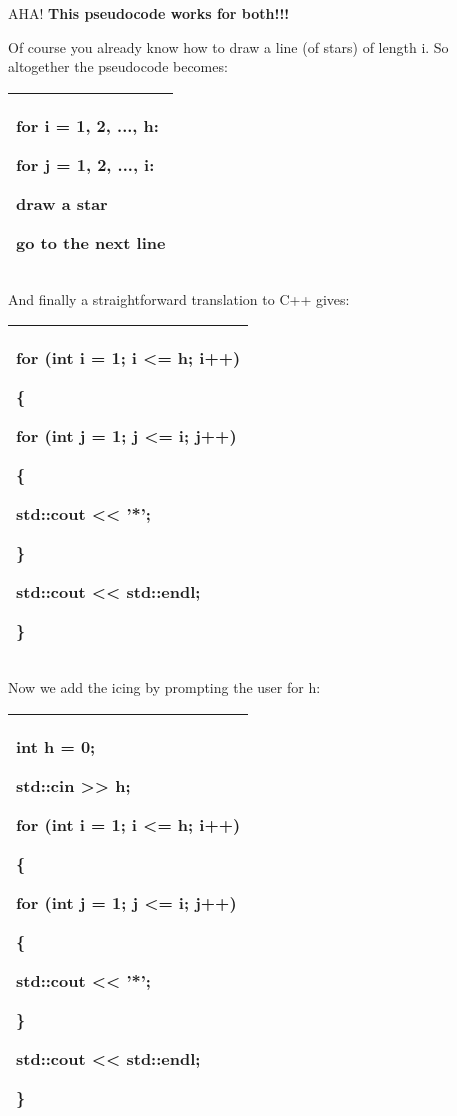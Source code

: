 \documentclass[
]{article}
\begin{document}
AHA! \textbf{This pseudocode works for both!!!}

Of course you already know how to draw a line (of stars) of length i. So
altogether the pseudocode becomes:

\begin{longtable}[]{@{}l@{}}
\toprule
\endhead
\begin{minipage}[t]{0.97\columnwidth}\raggedright
for i = 1, 2, ..., h:

for j = 1, 2, ..., i:

draw a star

go to the next line\strut
\end{minipage}\tabularnewline
\bottomrule
\end{longtable}

And finally a straightforward translation to C++ gives:

\begin{longtable}[]{@{}l@{}}
\toprule
\endhead
\begin{minipage}[t]{0.97\columnwidth}\raggedright
for (int i = 1; i \textless= h; i++)

\{

for (int j = 1; j \textless= i; j++)

\{

std::cout \textless\textless{} '*';

\}

std::cout \textless\textless{} std::endl;

\}\strut
\end{minipage}\tabularnewline
\bottomrule
\end{longtable}

Now we add the icing by prompting the user for h:

\begin{longtable}[]{@{}l@{}}
\toprule
\endhead
\begin{minipage}[t]{0.97\columnwidth}\raggedright
int h = 0;

std::cin \textgreater\textgreater{} h;

for (int i = 1; i \textless= h; i++)

\{

for (int j = 1; j \textless= i; j++)

\{

std::cout \textless\textless{} '*';

\}

std::cout \textless\textless{} std::endl;

\}\strut
\end{minipage}\tabularnewline
\bottomrule
\end{longtable}
\end{document}
